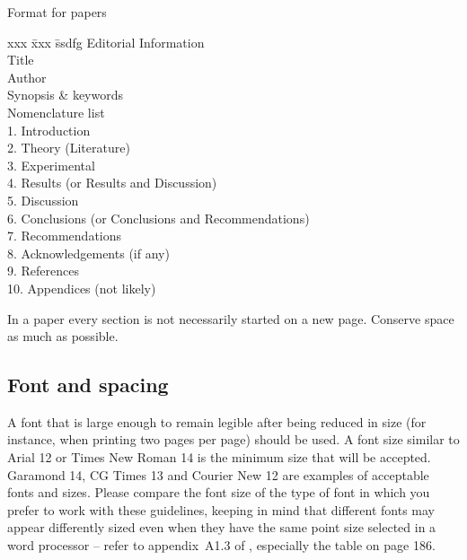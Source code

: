 \documentclass[a5paper, 10pt]{article}
\begin{document}
\begin{table}[htbp]
\centering
\caption{Format for papers}
\label{tab:paperformat}

\begin{boxedminipage}[t]{0.7\textwidth}
  \begin{spacing}{1.8}
    \begin{tabbing}
      xxx \= xxx \= ssdfg \kill
      Editorial Information                                    \\
          \> Title                                             \\
          \> Author                                            \\         
          \> Synopsis \& keywords                              \\
          \> Nomenclature list                                 \\
      1.  \> Introduction                                      \\
      2.  \> Theory  (Literature)                              \\
      3.  \> Experimental                                      \\
      4.  \> Results  (or Results and Discussion)              \\
      5.  \> Discussion                                        \\
      6.  \> Conclusions  (or Conclusions and Recommendations) \\
      7.  \> Recommendations                                   \\
      8.  \> Acknowledgements  (if any)                        \\
      9.  \> References                                        \\
      10. \> Appendices  (not likely)
    \end{tabbing}
  \end{spacing}
\end{boxedminipage}

In a paper every section is not necessarily started on a new page.
Conserve space as much as possible.
\end{table}

\subsection{Font and spacing}
A font that is large enough to remain legible after being reduced in
size (for instance, when printing two pages per page) should be used.
A font size similar to Arial 12 or Times New Roman 14 is the minimum
size that will be accepted.  Garamond 14, CG Times 13 and Courier New
12 are examples of acceptable fonts and sizes.  Please compare the
font size of the type of font in which you prefer to work with these
guidelines, keeping in mind that different fonts may appear
differently sized even when they have the same point size selected in
a word processor -- refer to appendix~A1.3 of
\citet{bruckmanmandersloot}, especially the table on page 186.
\end{document}
